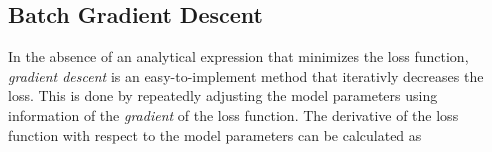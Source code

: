 




\subsection{Batch Gradient Descent}\label{sec:GradientDescent}
In the absence of an analytical expression that minimizes the loss function, \emph{gradient descent} is an easy-to-implement method that iterativly decreases the loss. This is done by repeatedly adjusting the model parameters using information of the \emph{gradient} of the loss function. The derivative of the loss function with respect to the model parameters can be calculated as

